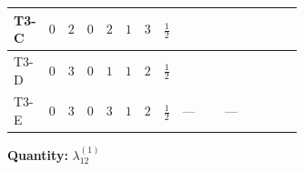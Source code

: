 \documentclass[8pt]{article}
\begin{document}
\begin{landscape}
\begin{longtable}{@{}llcccccc >{\raggedright\arraybackslash}p{0.21\linewidth} >{\raggedright\arraybackslash}p{0.21\linewidth} >{\raggedright\arraybackslash}p{0.21\linewidth}@{}}
\midrule
T3-C & $0$ & $2$ & $0$ & $2$ & $1$ & $3$ & $\frac{1}{2}$ & \scriptsize\adjustbox{max width=\linewidth}{$\begin{gathered} +6 {\lambda_{12}^{(1)}} {\lambda_{S_1}^{(1)}}\end{gathered}$} & \scriptsize\adjustbox{max width=\linewidth}{$\begin{gathered} +6 {\lambda_{12}^{(1)}} {\lambda_{S_2}^{(1)}}\end{gathered}$} & \scriptsize\adjustbox{max width=\linewidth}{$\begin{gathered} +4 {\lambda_{HS_1}^{(1)}} {\lambda_{HS_2}^{(1)}}\end{gathered}$} \\
\midrule
T3-D & $0$ & $3$ & $0$ & $1$ & $1$ & $2$ & $\frac{1}{2}$ & \scriptsize\adjustbox{max width=\linewidth}{$\begin{gathered} +8 {\lambda_{12}^{(1)}} {\lambda_{S_1}^{(1)}}\end{gathered}$} & \scriptsize\adjustbox{max width=\linewidth}{$\begin{gathered} +4 {\lambda_{12}^{(1)}} {\lambda_{S_2}^{(1)}}\end{gathered}$} & \scriptsize\adjustbox{max width=\linewidth}{$\begin{gathered} +4 {\lambda_{HS_1}^{(1)}} {\lambda_{HS_2}^{(1)}}\end{gathered}$} \\
\midrule
T3-E & $0$ & $3$ & $0$ & $3$ & $1$ & $2$ & $\frac{1}{2}$ & --- & --- & \scriptsize\adjustbox{max width=\linewidth}{$\begin{gathered} +4 {\lambda_{HS_1}^{(1)}} {\lambda_{HS_2}^{(1)}}\end{gathered}$} \\
\midrule
\bottomrule
\end{longtable}
\clearpage
\noindent\textbf{Quantity: }$\lambda_{12}^{(1)}$\par\smallskip

\end{landscape}
\end{document}
